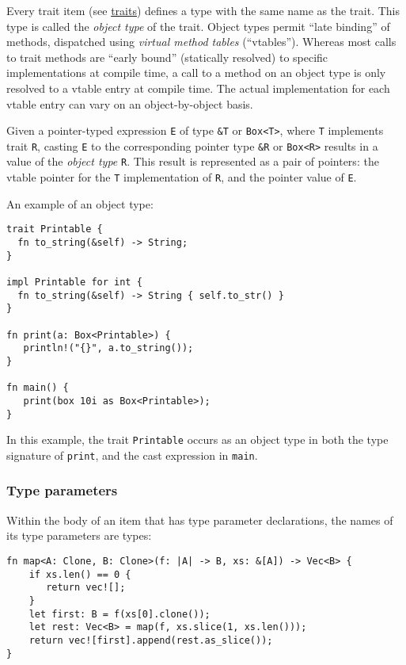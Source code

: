 \documentclass[]{article}
\begin{document}

Every trait item (see \hyperref[traits]{traits}) defines a type with the
same name as the trait. This type is called the \emph{object type} of
the trait. Object types permit ``late binding'' of methods, dispatched
using \emph{virtual method tables} (``vtables''). Whereas most calls to
trait methods are ``early bound'' (statically resolved) to specific
implementations at compile time, a call to a method on an object type is
only resolved to a vtable entry at compile time. The actual
implementation for each vtable entry can vary on an object-by-object
basis.

Given a pointer-typed expression \texttt{E} of type \texttt{\&T} or
\texttt{Box\textless{}T\textgreater{}}, where \texttt{T} implements
trait \texttt{R}, casting \texttt{E} to the corresponding pointer type
\texttt{\&R} or \texttt{Box\textless{}R\textgreater{}} results in a
value of the \emph{object type} \texttt{R}. This result is represented
as a pair of pointers: the vtable pointer for the \texttt{T}
implementation of \texttt{R}, and the pointer value of \texttt{E}.

An example of an object type:

\begin{verbatim}
trait Printable {
  fn to_string(&self) -> String;
}

impl Printable for int {
  fn to_string(&self) -> String { self.to_str() }
}

fn print(a: Box<Printable>) {
   println!("{}", a.to_string());
}

fn main() {
   print(box 10i as Box<Printable>);
}
\end{verbatim}

In this example, the trait \texttt{Printable} occurs as an object type
in both the type signature of \texttt{print}, and the cast expression in
\texttt{main}.

\subsubsection{Type parameters}\label{type-parameters-1}

Within the body of an item that has type parameter declarations, the
names of its type parameters are types:

\begin{verbatim}
fn map<A: Clone, B: Clone>(f: |A| -> B, xs: &[A]) -> Vec<B> {
    if xs.len() == 0 {
       return vec![];
    }
    let first: B = f(xs[0].clone());
    let rest: Vec<B> = map(f, xs.slice(1, xs.len()));
    return vec![first].append(rest.as_slice());
}
\end{verbatim}
\end{document}
